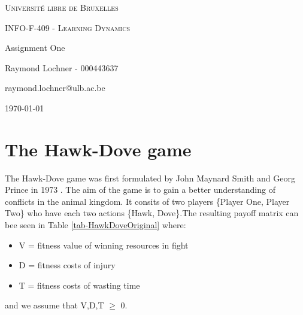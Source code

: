 \documentclass[a4paper, 11pt]{article}
\date{\today}
\begin{document}
\begin{titlepage}
	\centering
	{\scshape\LARGE Université libre de Bruxelles \par}
	\vspace{1cm}
	{\scshape\Large INFO-F-409 - Learning Dynamics\par}
	\vspace{1.5cm}
	{\huge\bfseries {Assignment One\par}}
	\vspace{2cm}
	{\Large Raymond Lochner - 000443637\par}
	\vspace{0.5cm}
	{\Large raymond.lochner@ulb.ac.be}
	\vfill
	
	\tableofcontents

\vfill
	{\large \today \par}
\end{titlepage}

\newpage

\section{The Hawk-Dove game}

The Hawk-Dove game was first formulated by John Maynard Smith and Georg Prince in 1973 \cite{MaynardSmith1973}. The aim of the game is to gain a better understanding of conflicts in the animal kingdom. It consits of two players \{Player One, Player Two\} who have each two actions \{Hawk, Dove\}.The resulting payoff matrix can bee seen in Table \ref{tab-HawkDoveOriginal} where:
\begin{itemize}
  \item V = fitness value of winning resources in fight
  \item D = fitness costs of injury
  \item T = fitness costs of wasting time
\end{itemize}

and we assume that V,D,T $\geq$ 0.
\end{document}
